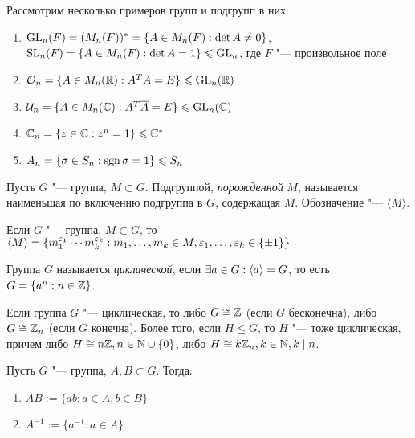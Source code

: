 \begin{example}
	Рассмотрим несколько примеров групп и подгрупп в них:
	\begin{enumerate}
		\item $\operatorname{GL}_n(F) = (M_n(F))^* = \{A \in M_n(F): \det{A} \ne 0\}$, $\SL_n(F) \hm= \{A \in M_n(F): \det{A} \hm= 1\} \le \GL_n$, где $F$ "--- произвольное поле
		\item $\mathcal{O}_n = \{A \in M_n(\mathbb{R}): A^TA = E\} \leqslant \operatorname{GL}_n(\mathbb{R})$
		\item $\mathcal{U}_n = \{A \in M_n(\mathbb{C}): A^T\overline{A} = E\} \leqslant \operatorname{GL}_n(\mathbb{C})$
		\item $\mathbb{C}_n = \{z \in \mathbb{C}: z^n = 1\} \leqslant \mathbb{C}^*$
		\item $A_n = \{\sigma \in S_n: \operatorname{\mathop{sgn}}\sigma = 1\} \leqslant S_n$
	\end{enumerate}
\end{example}

\begin{definition}
	Пусть $G$ "--- группа, $M \subset G$. Подгруппой, \textit{порожденной} $M$, называется наименьшая по включению подгруппа в $G$, содержащая $M$. Обозначение "--- $\langle M\rangle$.
\end{definition}

\begin{reminder}
	Если $G$ "--- группа, $M \subset G$, то $\langle M\rangle = \{m_1^{\epsilon_1}\dotsm m_k^{\epsilon_k}: m_1, \dotsc, m_k \hm\in M, \epsilon_1, \dotsc, \epsilon_k \in \{\pm1\}\}$
\end{reminder}

\begin{definition}
	Группа $G$ называется \textit{циклической}, если $\exists a \hm\in G: \langle a\rangle = G$, то есть $G = \{a^n: n \in \mathbb{Z}\}$.
\end{definition}

\begin{reminder}
	Если группа $G$ "--- циклическая, то либо $G \cong \mathbb{Z}$ (если $G$ бесконечна), либо $G \cong \mathbb{Z}_n$ (если $G$ конечна). Более того, если $H \le G$, то $H$ "--- тоже циклическая, причем либо $H \cong n\mathbb{Z}, n \in \mathbb{N}\cup\{0\}$, либо $H \cong k\mathbb{Z}_n, k \in \mathbb{N}, k\mid n$.
\end{reminder}

\begin{definition}
	Пусть $G$ "--- группа, $A, B \subset G$. Тогда:
	\begin{enumerate}
		\item $AB := \{ab: a \in A, b \in B\}$
		\item $A^{-1} := \{a^{-1}: a \in A\}$
	\end{enumerate}
\end{definition}

